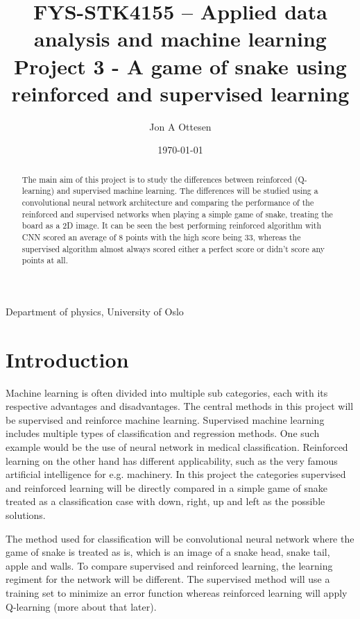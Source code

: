 \documentclass[%
 uio,
 jmp,
 amsmath,amssymb,
 reprint, nofootinbib]{revtex4-1}
\numberwithin{equation}{section}
\begin{document}
\title{FYS-STK4155 – Applied data analysis and machine learning\\ Project 3 - A game of snake using reinforced and supervised learning}%

\author{Jon A Ottesen}
{Department of physics, University of Oslo}%
\date{\today}

\begin{abstract}
The main aim of this project is to study the differences between reinforced (Q-learning) and supervised machine learning. The differences will be studied using a convolutional neural network architecture and comparing the performance of the reinforced and supervised networks when playing a simple game of snake, treating the board as a 2D image. It can be seen the best performing reinforced algorithm with CNN scored an average of 8 points with the high score being 33, whereas the supervised algorithm almost always scored either a perfect score or didn't score any points at all.
\end{abstract}

\maketitle


\section{Introduction}\label{sec:Introduction}

Machine learning is often divided into multiple sub categories, each with its respective advantages and disadvantages. The central methods in this project will be supervised and reinforce machine learning. Supervised machine learning includes multiple types of classification and regression methods. One such example would be the use of neural network in medical classification. Reinforced learning on the other hand has different applicability, such as the very famous artificial intelligence for e.g. machinery. In this project the categories supervised and reinforced learning will be directly compared in a simple game of snake treated as a classification case with down, right, up and left as the possible solutions.

The method used for classification will be convolutional neural network where the game of snake is treated as is, which is an image of a snake head, snake tail, apple and walls. To compare supervised and reinforced learning, the learning regiment for the network will be different. The supervised method will use a training set to minimize an error function whereas reinforced learning will apply Q-learning (more about that later). 
\end{document}

